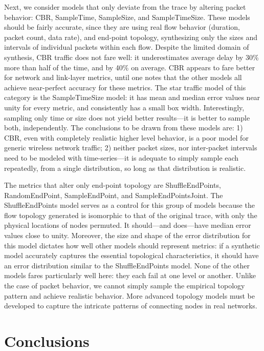 \documentclass[conference]{IEEEtran}
\newcommand{\caps}[1]{{\small{#1}}}
\begin{document}
Next, we consider models that only deviate from the trace by altering packet behavior: \caps{CBR}, SampleTime, SampleSize, and SampleTimeSize. These models should be fairly accurate, since they are using real flow behavior (duration, packet count, data rate), and end-point topology, synthesizing only the sizes and intervals of individual packets within each flow. Despite the limited domain of synthesis, \caps{CBR} traffic does not fare well: it underestimates average delay by 30\% more than half of the time, and by 40\% on average. \caps{CBR} appears to fare better for network and link-layer metrics, until one notes that the other models all achieve near-perfect accuracy for these metrics. The star traffic model of this category is the SampleTimeSize model: it has mean and median error values near unity for every metric, and consistently has a small box width. Interestingly, sampling only time or size does not yield better results---it is better to sample both, independently. The conclusions to be drawn from these models are: 1) \caps{CBR}, even with completely realistic higher level behavior, is a poor model for generic wireless network traffic; 2) neither packet sizes, nor inter-packet intervals need to be modeled with time-series---it is adequate to simply sample each repeatedly, from a single distribution, so long as that distribution is realistic.

The metrics that alter only end-point topology are ShuffleEndPoints, RandomEndPoint, SampleEndPoint, and SampleEndPointsJoint. The ShuffleEndPoints model serves as a control for this group of models because the flow topology generated is isomorphic to that of the original trace, with only the physical locations of nodes permuted. It should---and does---have median error values close to unity. Moreover, the size and shape of the error distribution for this model dictates how well other models should represent metrics: if a synthetic model accurately captures the essential topological characteristics, it should have an error distribution similar to the ShuffleEndPoints model. None of the other models fares particularly well here: they each fail at one level or another. Unlike the case of packet behavior, we cannot simply sample the empirical topology pattern and achieve realistic behavior. More advanced topology models must be developed to capture the intricate patterns of connecting nodes in real networks.

\section{Conclusions}\label{sec:conclusions}
\end{document}
